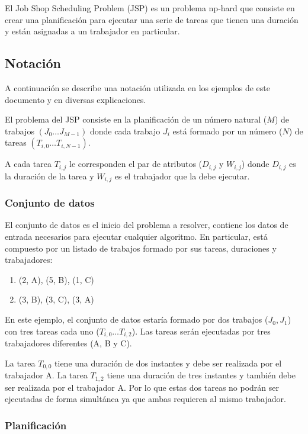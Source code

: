 \begin{keynotebox}
    El Job Shop Scheduling Problem (JSP) es un problema np-hard que
    consiste en crear una planificación
    para ejecutar una serie de tareas que tienen una duración y están asignadas
    a un trabajador en particular.
\end{keynotebox}

\subsection{Notación}

A continuación se describe una notación utilizada en los ejemplos
de este documento y en diversas explicaciones.

El problema del JSP consiste en la planificación de un número natural ($M$)
de trabajos $(J_0 \dots J_{M-1})$ donde cada trabajo $J_i$
está formado por un número ($N$) de tareas $(T_{i,0} \dots T_{i,N-1})$.

A cada tarea $T_{i,j}$ le corresponden el par de atributos ($D_{i,j}$ y $W_{i,j}$)
donde $D_{i,j}$ es la duración de la tarea
y $W_{i,j}$ es el trabajador que la debe ejecutar.

\subsubsection{Conjunto de datos}

El conjunto de datos es el inicio del problema a resolver,
contiene los datos de entrada necesarios para ejecutar cualquier
algoritmo.
En particular, está compuesto por un listado de trabajos
formado por sus tareas, duraciones y trabajadores:
\begin{enumerate}[start=0, itemsep=0.25px]
    \item (2, A), (5, B), (1, C)
    \item (3, B), (3, C), (3, A)
\end{enumerate}
En este ejemplo, el conjunto de datos estaría formado por dos trabajos
($J_0, J_1$)
con tres tareas cada uno ($T_{i,0} \dots T_{i,2}$).
Las tareas serán ejecutadas por tres trabajadores diferentes (A, B y C).

La tarea $T_{0,0}$ tiene una duración de dos instantes y
debe ser realizada por el trabajador A.
La tarea $T_{1,2}$ tiene una duración de tres instantes y
también debe ser realizada por el trabajador A.
Por lo que estas dos tareas no podrán ser ejecutadas de forma simultánea ya que ambas requieren al
mismo trabajador.

\subsubsection{Planificación}

